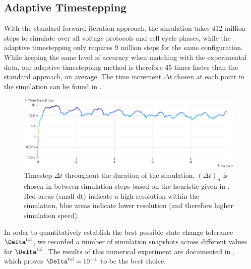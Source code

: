 \subsection{Adaptive Timestepping}
With the standard forward iteration approach, the simulation takes 412 million steps to simulate over all voltage protocols and cell cycle phases, while the adaptive timestepping only requires 9 million steps for the same configuration.
While keeping the same level of accuracy when matching with the experimental data, our adaptive timestepping method is therefore 45 times faster than the standard approach, on average.
The time increment $\Delta t$ chosen at each point in the simulation can be found in .

\begin{figure}
  \includegraphics[width=\columnwidth]{../figures/results/dt-plot.pdf}
  \caption{Timestep $\Delta t$ throughout the duration of the simulation. $(\Delta t)_n$ is chosen in between simulation steps based on the heuristic given in . Red areas (small dt) indicate a high resolution within the simulation, blue areas indicate lower resolution (and therefore higher simulation speed).}
  \label{figure:dt-plot}
\end{figure}

In order to quantitatively establish the best possible state change tolerance $\Delta^{\rm tol}$, we recorded a number of simulation snapshots across different values for $\Delta^{\rm tol}$.
The results of this numerical experiment are documented in , which proves $\Delta^{\rm tol} = 10^{-4}$ to be the best choice.

